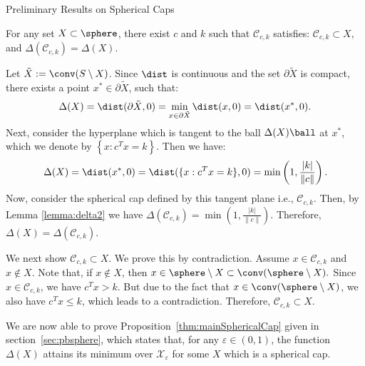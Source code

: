 \begin{section}{Preliminary Results on Spherical Caps}
\begin{lem}\label{lemma:constructSC}
For any set $X \subset \sphere$, there exist $c$ and $k$ such that $\mathcal{C}_{c,k}$ satisfies: $\mathcal{C}_{c,k} \subset X,$ and $\Delta(\mathcal{C}_{c,k}) = \Delta(X).$
\end{lem}

\begin{pf} Let $\tilde{X} := \conv(S \setminus X)$.
Since $\dist$ is continuous and the set $\partial \tilde{X}$ is compact, there exists a point $x^* \in \partial \tilde{X}$, such that:
\begin{eqnarray}\nonumber \Delta(X) = \dist(\partial\tilde{X}, 0) = 
\label{deltaSupporting} \min_{x \in \partial \tilde{X}}\dist(x, 0) = \dist(x^*, 0).\end{eqnarray} 
Next, consider the hyperplane which is tangent to the ball $\Delta(X)\ball$ at $x^*$, which we denote by $\left\{x : c^Tx = k\right\}$.
Then we have:
\begin{equation*}\Delta(X) =  \dist(x^*, 0) = \dist(\{x : c^Tx = k\}, 0) = \min\left(1, \frac{|k|}{\|c\|}\right).
\end{equation*}
Now, consider the spherical cap defined by this tangent plane i.e., $\mathcal{C}_{c, k}$. Then, by Lemma \ref{lemma:delta2} we have
$\Delta(\mathcal{C}_{c,k}) =  \min\left(1, \frac{|k|}{\|c\|}\right)$. Therefore, $\Delta(X) = \Delta(\mathcal{C}_{c,k})$.


We next show $\mathcal{C}_{c, k} \subset X$. We prove this by contradiction. Assume $x \in \mathcal{C}_{c,k}$ and $x \notin X$. Note that, if $x \notin X$, then $x \in \sphere \setminus X \subset \conv(\sphere \setminus X).$ Since $x \in \mathcal{C}_{c,k}$, we have $c^Tx>k$. But due to the fact that $x \in \conv(\sphere \setminus X)$, we also have $c^Tx \leq k$, which leads to a contradiction. Therefore, $\mathcal{C}_{c, k} \subset X$. 
\end{pf}

We are now able to prove Proposition~\ref{thm:mainSphericalCap} given in section~\ref{sec:pbsphere}, which states that, for any $\varepsilon \in (0,1)$, the function $\Delta(X)$ attains its minimum over $\mathcal{X}_{\varepsilon}$ for some $X$ which is a spherical cap.



\end{section}

